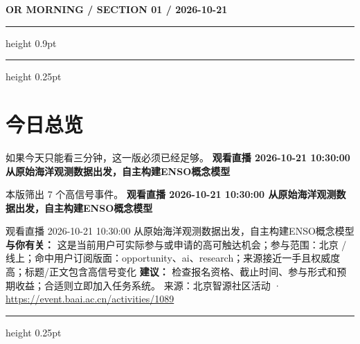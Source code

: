 \documentclass[10.5pt]{ctexart}
\begin{document}
{\small\bfseries OR MORNING / SECTION 01 / 2026-10-21}
\vspace{2mm}
\hrule height 0.9pt
\vspace{1.5mm}
\hrule height 0.25pt
\vspace{4mm}
\section*{今日总览}
{\color{ormuted} 如果今天只能看三分钟，这一版必须已经足够。}
\vspace{2mm}
{\fontsize{25}{29}\selectfont\bfseries 观看直播 2026-10-21 10:30:00 从原始海‮观洋‬测数据出发，自主构建ENSO概念模型}\par
\vspace{2mm}
{\large 本版筛出 7 个高信号事件。}
\vspace{3mm}
{\Large\bfseries 观看直播 2026-10-21 10:30:00 从原始海‮观洋‬测数据出发，自主构建ENSO概念模型}\par
观看直播 2026-10-21 10:30:00 从原始海‮观洋‬测数据出发，自主构建ENSO概念模型
\textbf{与你有关：} 这是当前用户可实际参与或申请的高可触达机会；参与范围：北京 / 线上；命中用户订阅版面：opportunity、ai、research；来源接近一手且权威度高；标题/正文包含高信号变化
\textbf{建议：} 检查报名资格、截止时间、参与形式和预期收益；合适则立即加入任务系统。
{\footnotesize\color{ormuted} 来源：北京智源社区活动 · \url{https://event.baai.ac.cn/activities/1089}}
\vspace{3mm}
\hrule height 0.25pt
\vspace{3mm}
\end{document}

